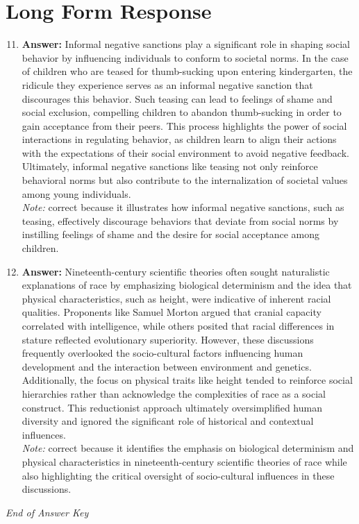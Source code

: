 \documentclass[12pt]{article}
\begin{document}
\section*{Long Form Response}
\begin{enumerate}[label=\arabic*.]
\setcounter{enumi}{10}
\item \textbf{Answer:} Informal negative sanctions play a significant role in shaping social behavior by influencing individuals to conform to societal norms. In the case of children who are teased for thumb-sucking upon entering kindergarten, the ridicule they experience serves as an informal negative sanction that discourages this behavior. Such teasing can lead to feelings of shame and social exclusion, compelling children to abandon thumb-sucking in order to gain acceptance from their peers. This process highlights the power of social interactions in regulating behavior, as children learn to align their actions with the expectations of their social environment to avoid negative feedback. Ultimately, informal negative sanctions like teasing not only reinforce behavioral norms but also contribute to the internalization of societal values among young individuals.
\\ \textit{Note:} correct because it illustrates how informal negative sanctions, such as teasing, effectively discourage behaviors that deviate from social norms by instilling feelings of shame and the desire for social acceptance among children.
\item \textbf{Answer:} Nineteenth-century scientific theories often sought naturalistic explanations of race by emphasizing biological determinism and the idea that physical characteristics, such as height, were indicative of inherent racial qualities. Proponents like Samuel Morton argued that cranial capacity correlated with intelligence, while others posited that racial differences in stature reflected evolutionary superiority. However, these discussions frequently overlooked the socio-cultural factors influencing human development and the interaction between environment and genetics. Additionally, the focus on physical traits like height tended to reinforce social hierarchies rather than acknowledge the complexities of race as a social construct. This reductionist approach ultimately oversimplified human diversity and ignored the significant role of historical and contextual influences.
\\ \textit{Note:} correct because it identifies the emphasis on biological determinism and physical characteristics in nineteenth-century scientific theories of race while also highlighting the critical oversight of socio-cultural influences in these discussions.
\end{enumerate}

\vfill
\noindent\textit{End of Answer Key}
\end{document}
